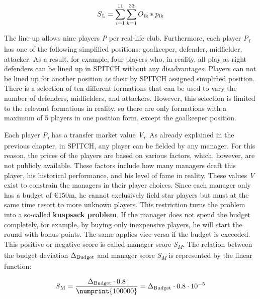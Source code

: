 \begin{equation}
    S\textsubscript{L} = \sum_{i=1}^{11} \sum_{k=1}^{33} O\textsubscript{ik} * p\textsubscript{ik}
    \label{eq:final_score_without_ms}
\end{equation}

The line-up allows nine players \emph{P} per real-life club. \parencite[cf.][]{spitch_rules_nodate} Furthermore, each player \emph{P\textsubscript{i}} has one of the following simplified positions: goalkeeper, defender, midfielder, attacker. As a result, for example, four players who, in reality, all play as right defenders can be lined up in SPITCH without any disadvantages. Players can not be lined up for another position as their by SPITCH assigned simplified position. There is a selection of ten different formations that can be used to vary the number of defenders, midfielders, and attackers. However, this selection is limited to the relevant formations in reality, so there are only formations with a maximum of 5 players in one position form, except the goalkeeper position.

Each player \emph{P\textsubscript{i}} has a transfer market value \emph{V\textsubscript{i}}. As already explained in the previous chapter, in SPITCH, any player can be fielded by any manager. For this reason, the prices of the players are based on various factors, which, however, are not publicly available. These factors include how many managers draft this player, his historical performance, and his level of fame in reality. These values \emph{V} exist to constrain the managers in their player choices. Since each manager only has a budget of €150m, he cannot exclusively field star players but must at the same time resort to more unknown players. This restriction turns the problem into a so-called \textbf{knapsack problem}. If the manager does not spend the budget completely, for example, by buying only inexpensive players, he will start the round with bonus points. The same applies vice versa if the budget is exceeded. This positive or negative score is called manager score \emph{S\textsubscript{M}}. The relation between the budget deviation \emph{$ \Delta \textsubscript{Budget} $} and manager score \emph{S\textsubscript{M}} is represented by the linear function:

\begin{equation}
    S\textsubscript{M} = \frac{\Delta \textsubscript{Budget}\cdot0.8}{\numprint{100000}} = \Delta \textsubscript{Budget}\cdot0.8\cdot10^{-5}
    \label{eq:value_to_manager_score}
\end{equation}

